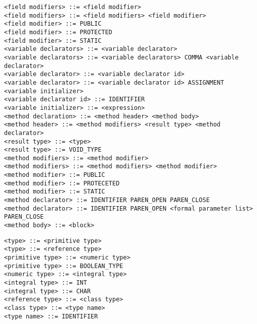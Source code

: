 \documentclass [a4paper,abstracton,titlepage]{scrartcl}
\begin{document}
\begin{lstlisting}
<field modifiers> ::= <field modifier>
<field modifiers> ::= <field modifiers> <field modifier>
<field modifier> ::= PUBLIC
<field modifier> ::= PROTECTED
<field modifier> ::= STATIC
<variable declarators> ::= <variable declarator>
<variable declarators> ::= <variable declarators> COMMA <variable declarator>
<variable declarator> ::= <variable declarator id>
<variable declarator> ::= <variable declarator id> ASSIGNMENT <variable initializer>
<variable declarator id> ::= IDENTIFIER
<variable initializer> ::= <expression>
<method declaration> ::= <method header> <method body>
<method header> ::= <method modifiers> <result type> <method declarator>
<result type> ::= <type>
<result type> ::= VOID_TYPE
<method modifiers> ::= <method modifier>
<method modifiers> ::= <method modifiers> <method modifier>
<method modifier> ::= PUBLIC
<method modifier> ::= PROTECETED
<method modifier> ::= STATIC
<method declarator> ::= IDENTIFIER PAREN_OPEN PAREN_CLOSE
<method declarator> ::= IDENTIFIER PAREN_OPEN <formal parameter list> PAREN_CLOSE
<method body> ::= <block>\end{lstlisting}

\begin{lstlisting}<type> ::= <primitive type>
<type> ::= <reference type>
<primitive type> ::= <numeric type>
<primitive type> ::= BOOLEAN_TYPE
<numeric type> ::= <integral type>
<integral type> ::= INT
<integral type> ::= CHAR
<reference type> ::= <class type>
<class type> ::= <type name>
<type name> ::= IDENTIFIER
\end{lstlisting}
\end{document}
